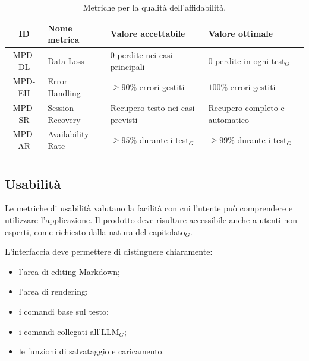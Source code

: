 \documentclass[a4paper, 10pt, colorlinks=true, linkcolor=black, urlcolor=blue, citecolor=blue, hidelinks]{article}
\begin{document}
\begingroup
\small
\renewcommand{\arraystretch}{1.25}
\begin{longtable}{|c|p{4cm}|p{3cm}|p{3cm}|}
    \hline
    \textbf{ID} & \textbf{Nome metrica} & \textbf{Valore accettabile} & \textbf{Valore ottimale} \\
    \hline
    \endhead

    MPD-DL & Data Loss & $0$ perdite nei casi principali & $0$ perdite in ogni test$_G$ \\ \hline
    MPD-EH & Error Handling & $\geq 90\%$ errori gestiti & $100\%$ errori gestiti \\ \hline
    MPD-SR & Session Recovery & Recupero testo nei casi previsti & Recupero completo e automatico \\ \hline
    MPD-AR & Availability Rate & $\geq 95\%$ durante i test$_G$ & $\geq 99\%$ durante i test$_G$ \\ \hline

    \caption{Metriche per la qualità dell'affidabilità.}
    \label{tab:metriche-affidabilita}
\end{longtable}
\endgroup

\subsection{Usabilità}

Le metriche di usabilità valutano la facilità con cui l'utente può comprendere e utilizzare l'applicazione. Il prodotto deve risultare accessibile anche a utenti non esperti, come richiesto dalla natura del capitolato$_G$.

L'interfaccia deve permettere di distinguere chiaramente:
\begin{itemize}
    \item l'area di editing Markdown;
    \item l'area di rendering;
    \item i comandi base sul testo;
    \item i comandi collegati all'LLM$_G$;
    \item le funzioni di salvataggio e caricamento.
\end{itemize}
\end{document}
